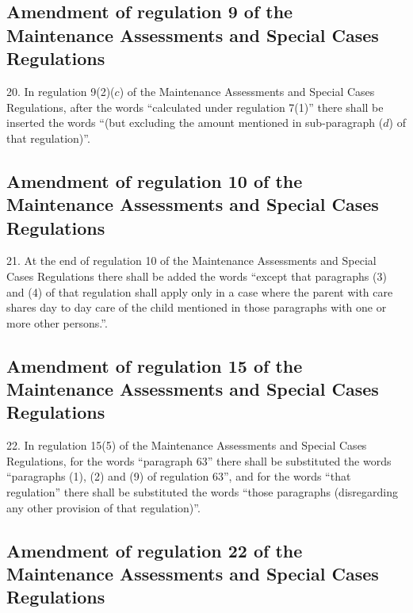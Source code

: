 \documentclass[a4paper]{article}
\begin{document}
\subsection[20. Amendment of regulation 9 of the Maintenance Assessments and Special Cases Regulations]{Amendment of regulation 9 of the Maintenance Assessments and Special Cases Regulations}

20.  In regulation 9(2)($c$) of the Maintenance Assessments and Special Cases Regulations, after the words “calculated under regulation 7(1)” there shall be inserted the words “(but excluding the amount mentioned in sub-paragraph ($d$) of that regulation)”.

\subsection[21. Amendment of regulation 10 of the Maintenance Assessments and Special Cases Regulations]{Amendment of regulation 10 of the Maintenance Assessments and Special Cases Regulations}

21.  At the end of regulation 10 of the Maintenance Assessments and Special Cases Regulations there shall be added the words “except that paragraphs (3) and (4) of that regulation shall apply only in a case where the parent with care shares day to day care of the child mentioned in those paragraphs with one or more other persons.”.

\subsection[22. Amendment of regulation 15 of the Maintenance Assessments and Special Cases Regulations]{Amendment of regulation 15 of the Maintenance Assessments and Special Cases Regulations}

22.  In regulation 15(5) of the Maintenance Assessments and Special Cases Regulations, for the words “paragraph 63” there shall be substituted the words “paragraphs (1), (2) and (9) of regulation 63”, and for the words “that regulation” there shall be substituted the words “those paragraphs (disregarding any other provision of that regulation)”.

\subsection[23. Amendment of regulation 22 of the Maintenance Assessments and Special Cases Regulations]{Amendment of regulation 22 of the Maintenance Assessments and Special Cases Regulations}
\end{document}
